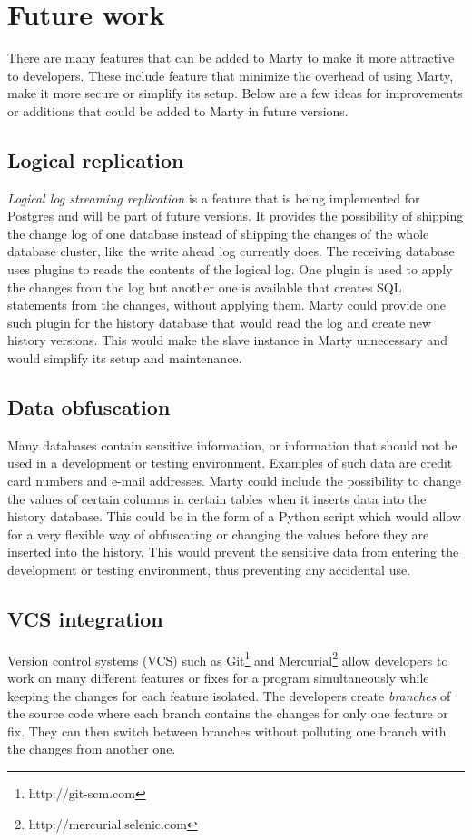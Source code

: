 \section{Future work}
There are many features that can be added to Marty to make it more attractive to developers.
These include feature that minimize the overhead of using Marty, make it more secure or simplify its setup.
Below are a few ideas for improvements or additions that could be added to Marty in future versions.

\subsection{Logical replication}
\textit{Logical log streaming replication} is a feature that is being implemented for Postgres and will be part of future versions.
It provides the possibility of shipping the change log of one database instead of shipping the changes of the whole database cluster, like the write ahead log currently does.
The receiving database uses plugins to reads the contents of the logical log.
One plugin is used to apply the changes from the log but another one is available that creates SQL statements from the changes, without applying them.
Marty could provide one such plugin for the history database that would read the log and create new history versions.
This would make the slave instance in Marty unnecessary and would simplify its setup and maintenance.

\subsection{Data obfuscation}
Many databases contain sensitive information, or information that should not be used in a development or testing environment.
Examples of such data are credit card numbers and e-mail addresses.
Marty could include the possibility to change the values of certain columns in certain tables when it inserts data into the history database.
This could be in the form of a Python script which would allow for a very flexible way of obfuscating or changing the values before they are inserted into the history.
This would prevent the sensitive data from entering the development or testing environment, thus preventing any accidental use.

\subsection{VCS integration}
Version control systems (VCS) such as Git\footnote{http://git-scm.com} and Mercurial\footnote{http://mercurial.selenic.com} allow developers to work on many different features or fixes for a program simultaneously while keeping the changes for each feature isolated.
The developers create \textit{branches} of the source code where each branch contains the changes for only one feature or fix.
They can then switch between branches without polluting one branch with the changes from another one.

